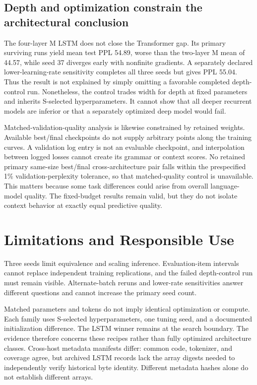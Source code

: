 \documentclass[10pt]{article}
\begin{document}
\subsection{Depth and optimization constrain the architectural conclusion}

The four-layer M LSTM does not close the Transformer gap. Its primary surviving runs yield mean test PPL 54.89, worse than the two-layer M mean of 44.57, while seed 37 diverges early with nonfinite gradients. A separately declared lower-learning-rate sensitivity completes all three seeds but gives PPL 55.04. Thus the result is not explained by simply omitting a favorable completed depth-control run. Nonetheless, the control trades width for depth at fixed parameters and inherits S-selected hyperparameters. It cannot show that all deeper recurrent models are inferior or that a separately optimized deep model would fail.

Matched-validation-quality analysis is likewise constrained by retained weights. Available best/final checkpoints do not supply arbitrary points along the training curves. A validation log entry is not an evaluable checkpoint, and interpolation between logged losses cannot create its grammar or context scores. No retained primary same-size best/final cross-architecture pair falls within the prespecified 1\% validation-perplexity tolerance, so that matched-quality control is unavailable. This matters because some task differences could arise from overall language-model quality. The fixed-budget results remain valid, but they do not isolate context behavior at exactly equal predictive quality.

\section{Limitations and Responsible Use}

Three seeds limit equivalence and scaling inference. Evaluation-item intervals cannot replace independent training replications, and the failed depth-control run must remain visible. Alternate-batch reruns and lower-rate sensitivities answer different questions and cannot increase the primary seed count.

Matched parameters and tokens do not imply identical optimization or compute. Each family uses S-selected hyperparameters, one tuning seed, and a documented initialization difference. The LSTM winner remains at the search boundary. The evidence therefore concerns these recipes rather than fully optimized architecture classes. Cross-host metadata manifests differ: common code, tokenizer, and coverage agree, but archived LSTM records lack the array digests needed to independently verify historical byte identity. Different metadata hashes alone do not establish different arrays.
\end{document}
